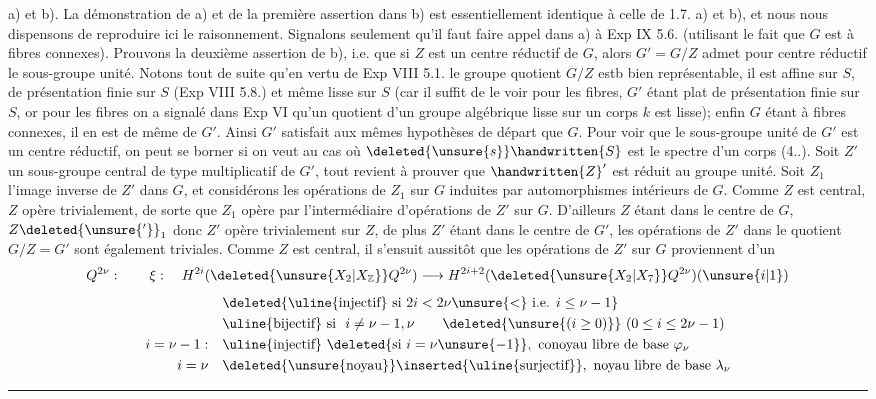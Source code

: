 a) et b). La démonstration de a) et de la première assertion dans b) est essentiellement identique à celle de 1.7. a) et b), et nous nous dispensons de reproduire ici le raisonnement. Signalons seulement qu'il faut faire appel dans a) à Exp IX 5.6. (utilisant le fait que $G$ est à fibres connexes). Prouvons la deuxième assertion de b), i.e. que si $Z$ est un centre réductif de $G$, alors $G'=G/Z$ admet pour centre réductif le sous-groupe unité.
Notons tout de suite qu'en vertu de Exp VIII 5.1. le groupe quotient $G/Z$ estb bien représentable, il est affine sur $S$, de présentation finie sur $S$ (Exp VIII 5.8.) et même lisse sur $S$ (car il suffit de le voir pour les fibres, $G'$ étant plat de présentation finie sur $S$, or pour les fibres  on a signalé dans Exp VI qu'un quotient d'un groupe algébrique lisse sur un corps $k$ est lisse); enfin $G$ étant à fibres connexes, il en est de même de $G'$. Ainsi $G'$ satisfait aux mêmes hypothèses de départ que $G$.
Pour voir que le sous-groupe unité de $G'$ est un centre réductif, on peut se borner si on veut au cas où $\deleted{\unsure{s}}\handwritten{S}$ est le spectre d'un corps (4..). Soit $Z'$ un sous-groupe central de type multiplicatif de $G'$, tout revient à prouver que $\handwritten{Z}'$ est réduit au groupe unité. Soit $Z_{1}$  l'image inverse de $Z'$ dans $G$, et considérons les opérations de $Z_{1}$ sur $G$ induites par automorphismes intérieurs de $G$. Comme $Z$ est central, $Z$ opère  trivialement, de sorte que $Z_{1}$ opère par l'intermédiaire d'opérations de $Z'$ sur $G$.
D'ailleurs $Z$ étant dans le centre de $G$, $Z\deleted{\unsure{'}}_{1}$ donc $Z'$ opère trivialement sur $Z$, de plus $Z'$ étant dans le centre de $G'$, les opérations de $Z'$ dans le quotient $G/Z=G'$ \handwritten{\unsure{/|(}}sont également triviales. Comme $Z$ est central, il s'ensuit aussitôt que les opérations de $Z'$ sur $G$ proviennent d'un
\[
Q^{2\nu}:\qquad \xi:\quad
H^{2i}(\deleted{\unsure{X_{2}|X_{\mathbb Z}}}Q^{2\nu})\longrightarrow
H^{2i+2}(\deleted{\unsure{X_{2}|X_{7}}}Q^{2\nu})(\unsure{i|1})
\]
\[
\begin{aligned}
&\deleted{\text{\uline{injectif} si }2i<2\nu\unsure{<}\ \text{i.e. }i\leq\nu-1}\\
&\text{\uline{bijectif} si }\ i\ne\nu-1,\nu
\qquad \deleted{\unsure{(i\geq0)}}\ (0\leq i\leq2\nu-1)\\
i=\nu-1:\quad &\text{\uline{injectif} }\deleted{\text{si }i=\nu\unsure{{-}1}},\
 \text{conoyau libre de base }\varphi_{\nu}\\
i=\nu\quad &\deleted{\text{\unsure{noyau}}}\text{\inserted{\uline{surjectif}}},\
 \text{noyau libre de base }\lambda_{\nu}
\end{aligned}
\]
\noindent\rule{.40\linewidth}{.4pt}

